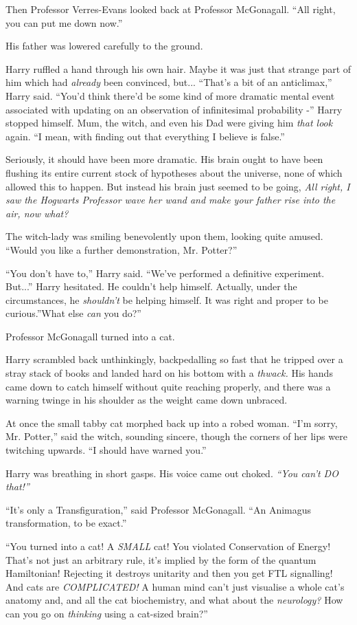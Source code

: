 Then Professor Verres-Evans looked back at Professor McGonagall. ``All
right, you can put me down now.''

His father was lowered carefully to the ground.

Harry ruffled a hand through his own hair. Maybe it was just that
strange part of him which had \emph{already} been convinced, but...
``That's a bit of an anticlimax,'' Harry said. ``You'd think there'd be
some kind of more dramatic mental event associated with updating on an
observation of infinitesimal probability -'' Harry stopped himself. Mum,
the witch, and even his Dad were giving him \emph{that look} again. ``I
mean, with finding out that everything I believe is false.''

Seriously, it should have been more dramatic. His brain ought to have
been flushing its entire current stock of hypotheses about the universe,
none of which allowed this to happen. But instead his brain just seemed
to be going, \emph{All right, I saw the Hogwarts Professor wave her wand
and make your father rise into the air, now what?}

The witch-lady was smiling benevolently upon them, looking quite amused.
``Would you like a further demonstration, Mr. Potter?''

``You don't have to,'' Harry said. ``We've performed a definitive
experiment. But...'' Harry hesitated. He couldn't help himself.
Actually, under the circumstances, he \emph{shouldn't} be helping
himself. It was right and proper to be curious.''What else \emph{can}
you do?''

Professor McGonagall turned into a cat.

Harry scrambled back unthinkingly, backpedalling so fast that he tripped
over a stray stack of books and landed hard on his bottom with a
\emph{thwack.} His hands came down to catch himself without quite
reaching properly, and there was a warning twinge in his shoulder as the
weight came down unbraced.

At once the small tabby cat morphed back up into a robed woman. ``I'm
sorry, Mr. Potter,'' said the witch, sounding sincere, though the
corners of her lips were twitching upwards. ``I should have warned
you.''

Harry was breathing in short gasps. His voice came out choked.
\emph{``You can't DO that!''}

``It's only a Transfiguration,'' said Professor McGonagall. ``An
Animagus transformation, to be exact.''

``You turned into a cat! A \emph{SMALL} cat! You violated Conservation of
Energy! That's not just an arbitrary rule, it's implied by the form of
the quantum Hamiltonian! Rejecting it destroys unitarity and then you
get FTL signalling! And cats are \emph{COMPLICATED!} A human mind can't
just visualise a whole cat's anatomy and, and all the cat biochemistry,
and what about the \emph{neurology?} How can you go on \emph{thinking}
using a cat-sized brain?''

